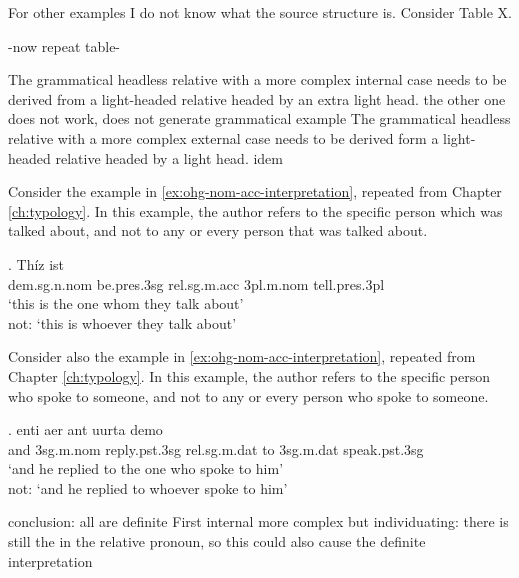 For other examples I do not know what the source structure is. Consider Table X.

-now repeat table-

The grammatical headless relative with a more complex internal case needs to be derived from a light-headed relative headed by an extra light head.
the other one does not work, does not generate grammatical example
The grammatical headless relative with a more complex external case needs to be derived form a light-headed relative headed by a light head.
idem

Consider the example in \ref{ex:ohg-nom-acc-interpretation}, repeated from Chapter \ref{ch:typology}.
In this example, the author refers to the specific person which was talked about, and not to any or every person that was talked about.

\exg. Thíz ist   \\
\ac{dem}.\ac{sg}.\ac{n}.\ac{nom} be.\ac{pres}.3\ac{sg}\scsub{[nom]} \ac{rel}.\ac{sg}.\ac{m}.\ac{acc}
3\ac{pl}.\ac{m}.\ac{nom} tell.\ac{pres}.3\ac{pl}\scsub{[acc]}\\
`this is the one whom they talk about'\\
not: `this is whoever they talk about' \label{ex:ohg-nom-acc-interpretation-1}

Consider also the example in \ref{ex:ohg-nom-acc-interpretation}, repeated from Chapter \ref{ch:typology}.
In this example, the author refers to the specific person who spoke to someone, and not to any or every person who spoke to someone.

\exg. enti aer {ant uurta} demo  \\
and 3\ac{sg}.\ac{m}.\ac{nom} reply.\ac{pst}.3\ac{sg}\scsub{[dat]} \ac{rel}.\ac{sg}.\ac{m}.\ac{dat} {to 3\ac{sg}.\ac{m}.\ac{dat}} speak.\ac{pst}.3\ac{sg}\scsub{[nom]}\\
`and he replied to the one who spoke to him'\\
not: `and he replied to whoever spoke to him'
 \label{ex:ohg-dat-nom-rep-1}

conclusion: all are definite
First internal more complex but individuating: there is still the  in the relative pronoun, so this could also cause the definite interpretation

